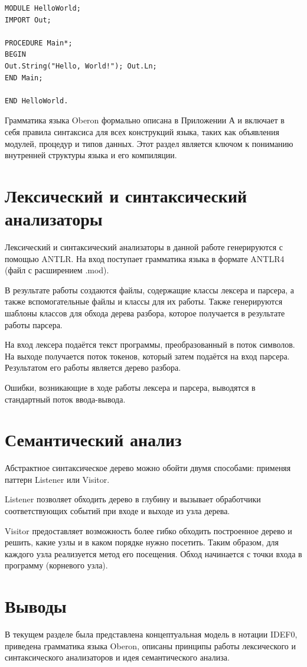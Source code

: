 \begin{lstlisting}[label = 7, caption = Краткий пример кода на языке Oberon]
MODULE HelloWorld;
IMPORT Out;

PROCEDURE Main*;
BEGIN
Out.String("Hello, World!"); Out.Ln;
END Main;

END HelloWorld.
\end{lstlisting}

Грамматика языка Oberon формально описана в Приложении А и включает в себя правила синтаксиса для всех конструкций языка, таких как объявления модулей, процедур и типов данных. Этот раздел является ключом к пониманию внутренней структуры языка и его компиляции.

\section{Лексический и синтаксический анализаторы}
Лексический и синтаксический анализаторы в данной работе генерируются с помощью ANTLR. На вход поступает грамматика языка в формате ANTLR4 (файл с расширением .mod).

В результате работы создаются файлы, содержащие классы лексера и парсера, а также вспомогательные файлы и классы для их работы. Также генерируются шаблоны классов для обхода дерева разбора, которое получается в результате работы парсера.

На вход лексера подаётся текст программы, преобразованный в поток символов. На выходе получается поток токенов, который затем подаётся на вход парсера. Результатом его работы является дерево разбора.

Ошибки, возникающие в ходе работы лексера и парсера, выводятся в стандартный поток ввода-вывода.

\section{Семантический анализ}
Абстрактное синтаксическое дерево можно обойти двумя способами: применяя паттерн Listener или Visitor.

Listener позволяет обходить дерево в глубину и вызывает обработчики соответствующих событий при входе и выходе из узла дерева.

Visitor предоставляет возможность более гибко обходить построенное дерево и решить, какие узлы и в каком порядке нужно посетить. Таким образом, для каждого узла реализуется метод его посещения. Обход начинается с точки входа в программу (корневого узла).

\section*{Выводы}

В текущем разделе была представлена концептуальная модель в нотации IDEF0, приведена грамматика языка Oberon, описаны принципы работы лексического и синтаксического анализаторов и идея семантического анализа.
